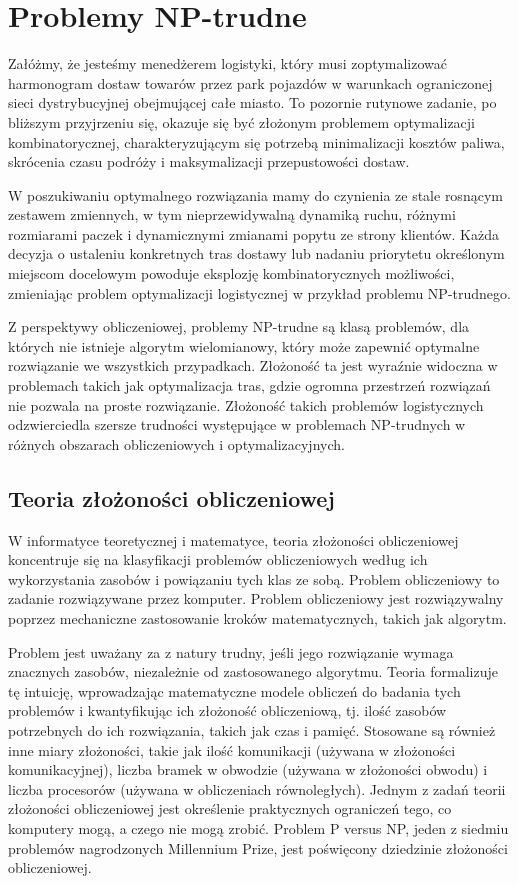 \chapter{Problemy NP-trudne}

Załóżmy, że jesteśmy menedżerem logistyki, który musi zoptymalizować harmonogram dostaw towarów przez park pojazdów w warunkach ograniczonej sieci dystrybucyjnej obejmującej całe miasto. To pozornie rutynowe zadanie, po bliższym przyjrzeniu się, okazuje się być złożonym problemem optymalizacji kombinatorycznej, charakteryzującym się potrzebą minimalizacji kosztów paliwa, skrócenia czasu podróży i maksymalizacji przepustowości dostaw.

W poszukiwaniu optymalnego rozwiązania mamy do czynienia ze stale rosnącym zestawem zmiennych, w tym nieprzewidywalną dynamiką ruchu, różnymi rozmiarami paczek i dynamicznymi zmianami popytu ze strony klientów. Każda decyzja o ustaleniu konkretnych tras dostawy lub nadaniu priorytetu określonym miejscom docelowym powoduje eksplozję kombinatorycznych możliwości, zmieniając problem optymalizacji logistycznej w przykład problemu NP-trudnego.

Z perspektywy obliczeniowej, problemy NP-trudne są klasą problemów, dla których nie istnieje algorytm wielomianowy, który może zapewnić optymalne rozwiązanie we wszystkich przypadkach. Złożoność ta jest wyraźnie widoczna w problemach takich jak optymalizacja tras, gdzie ogromna przestrzeń rozwiązań nie pozwala na proste rozwiązanie. Złożoność takich problemów logistycznych odzwierciedla szersze trudności występujące w problemach NP-trudnych w różnych obszarach obliczeniowych i optymalizacyjnych.

\section{Teoria złożoności obliczeniowej}

W informatyce teoretycznej i matematyce, teoria złożoności obliczeniowej koncentruje się na klasyfikacji problemów obliczeniowych według ich wykorzystania zasobów i powiązaniu tych klas ze sobą. Problem obliczeniowy to zadanie rozwiązywane przez komputer. Problem obliczeniowy jest rozwiązywalny poprzez mechaniczne zastosowanie kroków matematycznych, takich jak algorytm.

Problem jest uważany za z natury trudny, jeśli jego rozwiązanie wymaga znacznych zasobów, niezależnie od zastosowanego algorytmu. Teoria formalizuje tę intuicję, wprowadzając matematyczne modele obliczeń do badania tych problemów i kwantyfikując ich złożoność obliczeniową, tj. ilość zasobów potrzebnych do ich rozwiązania, takich jak czas i pamięć. Stosowane są również inne miary złożoności, takie jak ilość komunikacji (używana w złożoności komunikacyjnej), liczba bramek w obwodzie (używana w złożoności obwodu) i liczba procesorów (używana w obliczeniach równoległych). Jednym z zadań teorii złożoności obliczeniowej jest określenie praktycznych ograniczeń tego, co komputery mogą, a czego nie mogą zrobić. Problem P versus NP, jeden z siedmiu problemów nagrodzonych Millennium Prize, jest poświęcony dziedzinie złożoności obliczeniowej.

